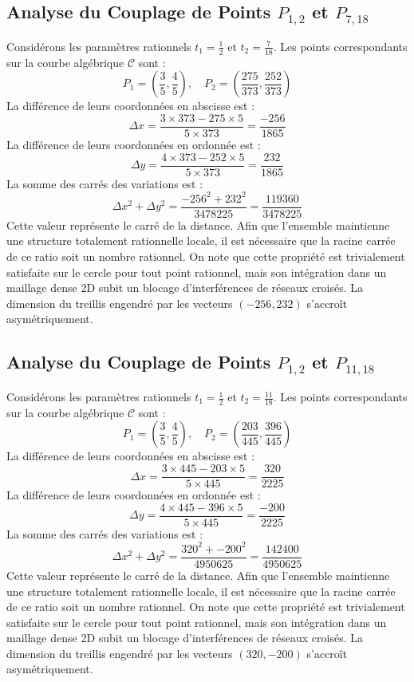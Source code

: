 \documentclass[12pt, a4paper]{article}
\begin{document}
\subsection{Analyse du Couplage de Points $P_{1,2}$ et $P_{7,18}$}
Considérons les paramètres rationnels $t_1 = \frac{1}{2}$ et $t_2 = \frac{7}{18}$.
Les points correspondants sur la courbe algébrique $\mathcal{C}$ sont :
$$ P_1 = \left( \frac{3}{5}, \frac{4}{5} \right), \quad P_2 = \left( \frac{275}{373}, \frac{252}{373} \right) $$
La différence de leurs coordonnées en abscisse est :
$$ \Delta x = \frac{3 \times 373 - 275 \times 5}{5 \times 373} = \frac{-256}{1865} $$
La différence de leurs coordonnées en ordonnée est :
$$ \Delta y = \frac{4 \times 373 - 252 \times 5}{5 \times 373} = \frac{232}{1865} $$
La somme des carrés des variations est :
$$ \Delta x^2 + \Delta y^2 = \frac{ -256^2 + 232^2 }{ 3478225 } = \frac{ 119360 }{ 3478225 } $$
Cette valeur représente le carré de la distance. Afin que l'ensemble maintienne une structure totalement rationnelle locale, il est nécessaire que la racine carrée de ce ratio soit un nombre rationnel. On note que cette propriété est trivialement satisfaite sur le cercle pour tout point rationnel, mais son intégration dans un maillage dense 2D subit un blocage d'interférences de réseaux croisés. La dimension du treillis engendré par les vecteurs $( -256, 232 )$ s'accroît asymétriquement.


\subsection{Analyse du Couplage de Points $P_{1,2}$ et $P_{11,18}$}
Considérons les paramètres rationnels $t_1 = \frac{1}{2}$ et $t_2 = \frac{11}{18}$.
Les points correspondants sur la courbe algébrique $\mathcal{C}$ sont :
$$ P_1 = \left( \frac{3}{5}, \frac{4}{5} \right), \quad P_2 = \left( \frac{203}{445}, \frac{396}{445} \right) $$
La différence de leurs coordonnées en abscisse est :
$$ \Delta x = \frac{3 \times 445 - 203 \times 5}{5 \times 445} = \frac{320}{2225} $$
La différence de leurs coordonnées en ordonnée est :
$$ \Delta y = \frac{4 \times 445 - 396 \times 5}{5 \times 445} = \frac{-200}{2225} $$
La somme des carrés des variations est :
$$ \Delta x^2 + \Delta y^2 = \frac{ 320^2 + -200^2 }{ 4950625 } = \frac{ 142400 }{ 4950625 } $$
Cette valeur représente le carré de la distance. Afin que l'ensemble maintienne une structure totalement rationnelle locale, il est nécessaire que la racine carrée de ce ratio soit un nombre rationnel. On note que cette propriété est trivialement satisfaite sur le cercle pour tout point rationnel, mais son intégration dans un maillage dense 2D subit un blocage d'interférences de réseaux croisés. La dimension du treillis engendré par les vecteurs $( 320, -200 )$ s'accroît asymétriquement.
\end{document}
